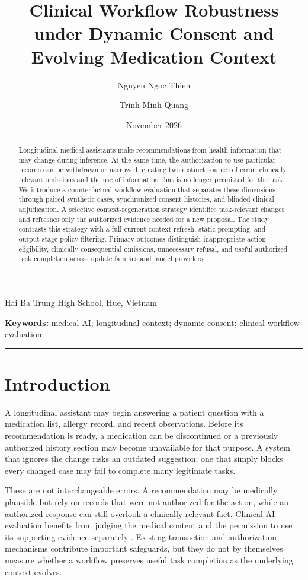 \documentclass[11pt,a4paper]{article}
\title{\vspace{-1em}\textbf{Clinical Workflow Robustness under Dynamic Consent and Evolving Medication Context}}
\author{Nguyen Ngoc Thien \and Trinh Minh Quang}\date{November 2026}
\begin{document}
\maketitle
\begin{center}\small Hai Ba Trung High School, Hue, Vietnam\end{center}
\begin{abstract}
Longitudinal medical assistants make recommendations from health information that may change during inference. At the same time, the authorization to use particular records can be withdrawn or narrowed, creating two distinct sources of error: clinically relevant omissions and the use of information that is no longer permitted for the task. We introduce a counterfactual workflow evaluation that separates these dimensions through paired synthetic cases, synchronized consent histories, and blinded clinical adjudication. A selective context-regeneration strategy identifies task-relevant changes and refreshes only the authorized evidence needed for a new proposal. The study contrasts this strategy with a full current-context refresh, static prompting, and output-stage policy filtering. Primary outcomes distinguish inappropriate action eligibility, clinically consequential omissions, unnecessary refusal, and useful authorized task completion across update families and model providers.
\end{abstract}
\noindent\textbf{Keywords:} medical AI; longitudinal context; dynamic consent; clinical workflow evaluation.
\medskip\hrule\medskip

\section{Introduction}
A longitudinal assistant may begin answering a patient question with a medication list, allergy record, and recent observations. Before its recommendation is ready, a medication can be discontinued or a previously authorized history section may become unavailable for that purpose. A system that ignores the change risks an outdated suggestion; one that simply blocks every changed case may fail to complete many legitimate tasks.

These are not interchangeable errors. A recommendation may be medically plausible but rely on records that were not authorized for the action, while an authorized response can still overlook a clinically relevant fact. Clinical AI evaluation benefits from judging the medical content and the permission to use its supporting evidence separately \cite{who2021,fhir2023}. Existing transaction and authorization mechanisms contribute important safeguards, but they do not by themselves measure whether a workflow preserves useful task completion as the underlying context evolves.
\end{document}
